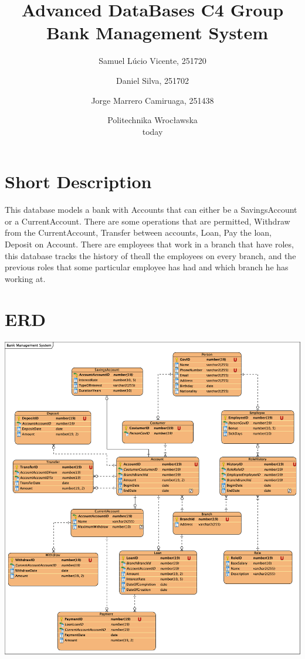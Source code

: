 \documentclass[a4paper, 10pt]{article}
\begin{document}
\title{Advanced DataBases C4 Group\\\
  \huge Bank Management System}
\author{
  Samuel Lúcio Vicente, 251720
  \and
  Daniel Silva, 251702
  \and
  Jorge Marrero Camiruaga, 251438
}

\date{Politechnika Wrocławska\\today}

\maketitle


\section{Short Description}
This database models a bank with Accounts that can either be a SavingsAccount or a CurrentAccount. There are some operations that are permitted, Withdraw from the CurrentAccount, Transfer between accounts, Loan, Pay the loan, Deposit on Account. There are employees that work in a branch that have roles, this database tracks the history of theall the employees on every branch, and the previous roles that some particular employee has had and which branch he has working at.

\section{ERD}
\includegraphics[width=\textwidth,height=\textheight,keepaspectratio]{bms3}
\end{document}
